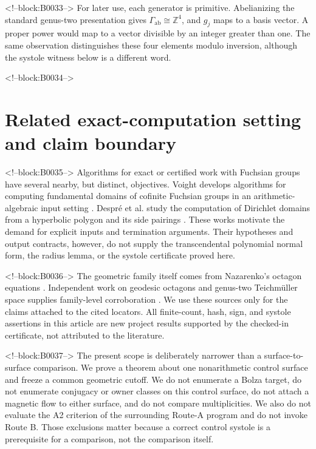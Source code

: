 \documentclass[11pt,a4paper]{article}
\theoremstyle{definition}
\newcommand{\Z}{\mathbb Z}
\begin{document}
<!--block:B0033-->
For later use, each generator is primitive.  Abelianizing the standard
genus-two presentation gives \(\Gamma_{\mathrm{ab}}\cong\Z^4\), and \(g_j\)
maps to a basis vector.  A proper power would map to a vector divisible by an
integer greater than one.  The same observation distinguishes these four
elements modulo inversion, although the systole witness below is a different
word.

<!--block:B0034-->
\section{Related exact-computation setting and claim boundary}

<!--block:B0035-->
Algorithms for exact or certified work with Fuchsian groups have several
nearby, but distinct, objectives.  Voight develops algorithms for computing
fundamental domains of cofinite Fuchsian groups in an arithmetic-algebraic
input setting \cite[Secs.~1--4]{Voight2009}.  Despr\'{e} et al. study the
computation of Dirichlet domains from a hyperbolic polygon and its side
pairings \cite[Secs.~2--3]{DespreEtAl2023}.  These works motivate the demand
for explicit inputs and termination arguments.  Their hypotheses and output
contracts, however, do not supply the transcendental polynomial normal form,
the radius lemma, or the systole certificate proved here.

<!--block:B0036-->
The geometric family itself comes from Nazarenko's octagon equations
\cite[eqs.~(10)--(18)]{Nazarenko2013}.  Independent work on geodesic
octagons and genus-two Teichm{\"u}ller space supplies family-level
corroboration \cite[abstract]{AigonDupuyEtAl2005}.  We use these sources only for the
claims attached to the cited locators.  All finite-count, hash, sign, and
systole assertions in this article are new project results supported by the
checked-in certificate, not attributed to the literature.

<!--block:B0037-->
The present scope is deliberately narrower than a surface-to-surface
comparison.  We prove a theorem about one nonarithmetic control surface and
freeze a common geometric cutoff.  We do not enumerate a Bolza target, do not
enumerate conjugacy or owner classes on this control surface, do not attach a
magnetic flow to either surface, and do not compare multiplicities.  We also
do not evaluate the A2 criterion of the surrounding Route-A program and do
not invoke Route B.  Those exclusions matter because a correct control
systole is a prerequisite for a comparison, not the comparison itself.
\end{document}
